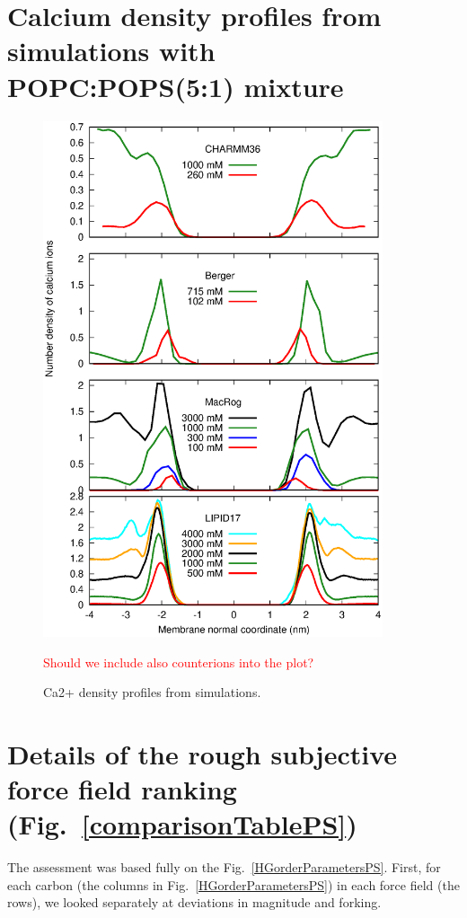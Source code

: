 \documentclass[journal=jpcbfk]{achemso}
\newcommand{\todo}[1]{\textcolor{red}{#1}}
\begin{document}
\section{Calcium density profiles from simulations with \\ POPC:POPS(5:1) mixture}
\begin{figure}[ht]
  \centering
  \includegraphics[width=10cm]{../Figs/CAdensPCPSmixture.eps}
  \caption{\label{CAdensPCPSmixtureALL}
    Ca2+ density profiles from simulations.
  }
  \todo{Should we include also counterions into the plot?} \\
\end{figure}

\pagebreak
\section{Details of the rough subjective force field ranking (Fig.~\ref{comparisonTablePS})} 

The assessment was based fully on the Fig.~\ref{HGorderParametersPS}.
%
First, for each carbon (the columns in Fig.~\ref{HGorderParametersPS}) in each force field (the rows),
we looked separately at deviations in magnitude and forking.
\end{document}
